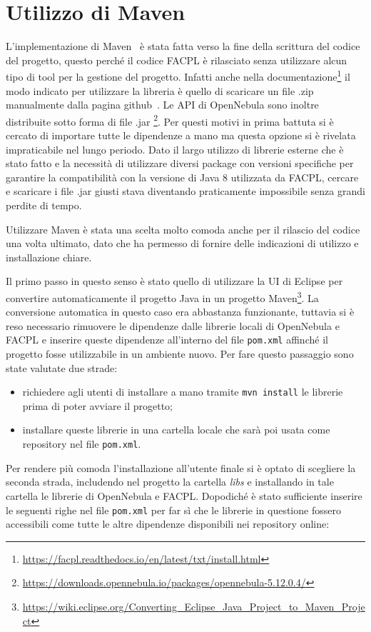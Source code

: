 \section{Utilizzo di Maven} \label{sec:maven}
L'implementazione di Maven~\cite{maven} è stata fatta verso la fine della scrittura del codice del progetto, questo perché il codice FACPL è rilasciato senza utilizzare alcun tipo di tool per la gestione del progetto. Infatti anche nella documentazione\footnote{\url{https://facpl.readthedocs.io/en/latest/txt/install.html}} il modo indicato per utilizzare la libreria è quello di scaricare un file .zip manualmente dalla pagina github~\cite{facpl-github}. Le API di OpenNebula sono inoltre distribuite sotto forma di file .jar \footnote{\url{https://downloads.opennebula.io/packages/opennebula-5.12.0.4/}}. Per questi motivi in prima battuta si è cercato di importare tutte le dipendenze a mano ma questa opzione si è rivelata impraticabile nel lungo periodo. Dato il largo utilizzo di librerie esterne che è stato fatto e la necessità di utilizzare diversi package con versioni specifiche per garantire la compatibilità con la versione di Java 8 utilizzata da FACPL, cercare e scaricare i file .jar giusti stava diventando praticamente impossibile senza grandi perdite di tempo.\par Utilizzare Maven è stata una scelta molto comoda anche per il rilascio del codice una volta ultimato, dato che ha permesso di fornire delle indicazioni di utilizzo e installazione chiare.\par
Il primo passo in questo senso è stato quello di utilizzare la UI di Eclipse per convertire automaticamente il progetto Java in un progetto Maven\footnote{\url{https://wiki.eclipse.org/Converting_Eclipse_Java_Project_to_Maven_Project}}. La conversione automatica in questo caso era abbastanza funzionante, tuttavia si è reso necessario rimuovere le dipendenze dalle librerie locali di OpenNebula e FACPL e inserire queste dipendenze all'interno del file \texttt{pom.xml} affinché il progetto fosse utilizzabile in un ambiente nuovo. Per fare questo passaggio sono state valutate due strade:
\begin{itemize}
    \item richiedere agli utenti di installare a mano tramite \texttt{mvn install} le librerie prima di poter avviare il progetto;
    \item installare queste librerie in una cartella locale che sarà poi usata come repository nel file \texttt{pom.xml}.
\end{itemize}
Per rendere più comoda l'installazione all'utente finale si è optato di scegliere la seconda strada, includendo nel progetto la cartella \emph{libs} e installando in tale cartella le librerie di OpenNebula e FACPL. Dopodiché è stato sufficiente inserire le seguenti righe nel file \texttt{pom.xml} per far sì che le librerie in questione fossero accessibili come tutte le altre dipendenze disponibili nei repository online:
